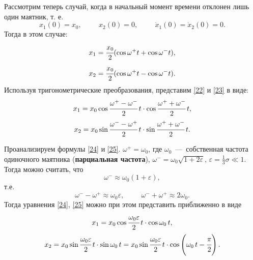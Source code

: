 \documentclass[a4paper,12pt]{article}
\theoremstyle{plain} %
\theoremstyle{definition} %
\theoremstyle{remark} %
\renewcommand{\epsilon}{\ensuremath{\varepsilon}}
\begin{document}
Рассмотрим теперь случай, когда в начальный момент времени отклонен лишь один маятник, т. е.
$$x_1(0)=x_0, \hspace{1cm} x_2(0)=0, \hspace{1cm} \dot{x}_1(0)=\dot{x}_2(0)=0.$$
Тогда в этом случае:
\begin{equation}
x_1=\cfrac{x_0}{2}(\cos\omega^+t+\cos\omega^-t),
\label{22}
\end{equation}
\begin{equation}
x_2=\cfrac{x_0}{2}(\cos\omega^+t-\cos\omega^-t).
\label{23}
\end{equation}
Используя тригонометрические преобразования, представим \eqref{22} и \eqref{23} в виде:
\begin{equation}
x_1=x_0\cos\cfrac{\omega^+-\omega^-}{2}\,t\cdot\cos\cfrac{\omega^++\omega^-}{2}\,t,
\label{24}
\end{equation}
\begin{equation}
x_2=x_0\sin\cfrac{\omega^--\omega^+}{2}\,t\cdot\sin\cfrac{\omega^++\omega^-}{2}\,t.
\label{25}
\end{equation}

Проанализируем формулы \eqref{24} и \eqref{25}. $\omega^+=\omega_0$, где $\omega_0$~---~собственная частота одиночного маятника (\textbf{парциальная частота}), $\omega^-=\omega_0\sqrt{1+2\varepsilon},\, \varepsilon=\frac{1}{3}\sigma \ll 1.$ Тогда можно считать, что
$$\omega^-\approx\omega_0(1+\varepsilon),$$
т.е.
$$\omega^--\omega^+ \approx \omega_0\varepsilon, \hspace{1cm} \omega^-+\omega^+\approx2\omega_0.$$
Тогда уравнения \eqref{24}, \eqref{25} можно при этом представить приближенно в
виде
\begin{equation}
x_1=x_0\cos\cfrac{\omega_0\varepsilon}{2}\,t\cdot\cos\omega_0\,t,
\label{26}
\end{equation}
\begin{equation}
x_2=x_0\sin\cfrac{\omega_0\varepsilon}{2}\,t\cdot\sin\omega_0\,t=x_0\sin\cfrac{\omega_0\epsilon}{2}\,t\cdot\cos\left(\omega_0\,t-\cfrac{\pi}{2}\right).
\label{27}
\end{equation}
\end{document}
